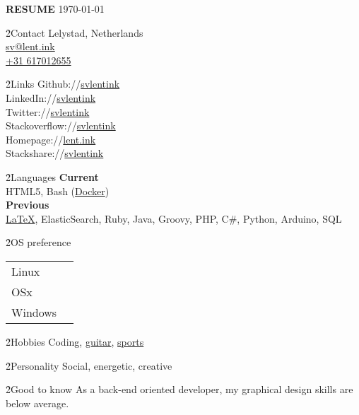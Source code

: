 \LARGE \textbf{RESUME}
\scriptsize \today \normalsize



\h{2}{Contact}{}
Lelystad, Netherlands \\
\href{mailto:sv@lent.ink}{sv@lent.ink} \\
\href{tel:0031617012655}{+31 617012655}

\h{2}{Links}{}
Github://\href{http://github.com/svlentink}{svlentink} \\
LinkedIn://\href{http://linkedin.com/in/svlentink}{svlentink} \\
Twitter://\href{http://twitter.com/svlentink}{svlentink} \\
Stackoverflow://\href{http://stackoverflow.com/users/3037245/svlentink}{svlentink} \\
Homepage://\href{http://lent.ink}{lent.ink} \\
Stackshare://\href{http://stackshare.io/svlentink/lent-ink}{svlentink}

\h{2}{Languages}{}
\textbf{Current} \\
HTML5,
Bash (\href{http://hub.docker.com/r/svlentink}{Docker})
\\
\textbf{Previous} \\
\href{https://github.com/svlentink/resume}{LaTeX},
ElasticSearch,
Ruby,
Java,
Groovy,
PHP,
C\#,
Python,
Arduino,
SQL

\h{2}{OS preference}{}
\begin{tabu} to  \linewidth { X[l]X[r] }
  Linux &  \\
	OSx &  \\
	Windows & 
\end{tabu}

\h{2}{Hobbies}{}
Coding,
\href{http://svlentink.co.nf/chords}{guitar},
\href{http://svlentink.co.nf/run}{sports}

\h{2}{Personality}{}
Social, energetic, creative

\h{2}{Good to know}{}
As a back-end oriented developer,
my graphical design skills are below average.
